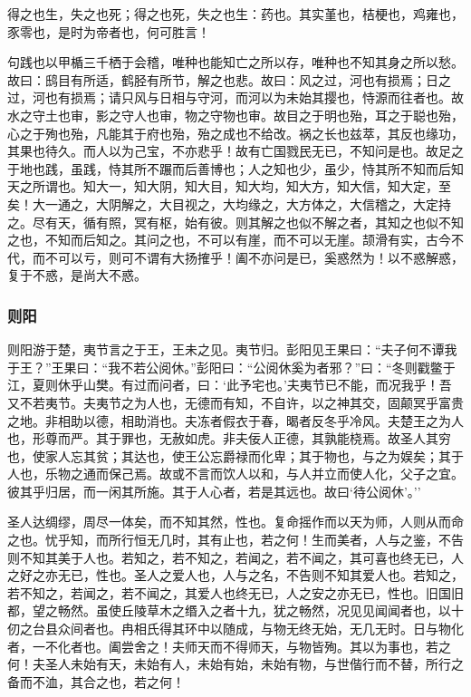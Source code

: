 \documentclass[]{article}
\begin{document}
得之也生，失之也死；得之也死，失之也生：药也。其实堇也，桔梗也，鸡雍也，豕零也，是时为帝者也，何可胜言！

句践也以甲楯三千栖于会稽，唯种也能知亡之所以存，唯种也不知其身之所以愁。故曰：鸱目有所适，鹤胫有所节，解之也悲。故曰：风之过，河也有损焉；日之过，河也有损焉；请只风与日相与守河，而河以为未始其撄也，恃源而往者也。故水之守土也审，影之守人也审，物之守物也审。故目之于明也殆，耳之于聪也殆，心之于殉也殆，凡能其于府也殆，殆之成也不给改。祸之长也兹萃，其反也缘功，其果也待久。而人以为己宝，不亦悲乎！故有亡国戮民无已，不知问是也。故足之于地也践，虽践，恃其所不蹍而后善博也；人之知也少，虽少，恃其所不知而后知天之所谓也。知大一，知大阴，知大目，知大均，知大方，知大信，知大定，至矣！大一通之，大阴解之，大目视之，大均缘之，大方体之，大信稽之，大定持之。尽有天，循有照，冥有枢，始有彼。则其解之也似不解之者，其知之也似不知之也，不知而后知之。其问之也，不可以有崖，而不可以无崖。颉滑有实，古今不代，而不可以亏，则可不谓有大扬搉乎！阖不亦问是已，奚惑然为！以不惑解惑，复于不惑，是尚大不惑。

\hypertarget{header-n414}{%
\subsubsection{则阳}\label{header-n414}}

则阳游于楚，夷节言之于王，王未之见。夷节归。彭阳见王果曰：``夫子何不谭我于王？''王果曰：``我不若公阅休。''彭阳曰：``公阅休奚为者邪？''曰：``冬则戳鳖于江，夏则休乎山樊。有过而问者，曰：`此予宅也。'夫夷节已不能，而况我乎！吾又不若夷节。夫夷节之为人也，无德而有知，不自许，以之神其交，固颠冥乎富贵之地。非相助以德，相助消也。夫冻者假衣于春，暍者反冬乎冷风。夫楚王之为人也，形尊而严。其于罪也，无赦如虎。非夫佞人正德，其孰能桡焉。故圣人其穷也，使家人忘其贫；其达也，使王公忘爵禄而化卑；其于物也，与之为娱矣；其于人也，乐物之通而保己焉。故或不言而饮人以和，与人并立而使人化，父子之宜。彼其乎归居，而一闲其所施。其于人心者，若是其远也。故曰`待公阅休'。''

圣人达绸缪，周尽一体矣，而不知其然，性也。复命摇作而以天为师，人则从而命之也。忧乎知，而所行恒无几时，其有止也，若之何！生而美者，人与之鉴，不告则不知其美于人也。若知之，若不知之，若闻之，若不闻之，其可喜也终无已，人之好之亦无已，性也。圣人之爱人也，人与之名，不告则不知其爱人也。若知之，若不知之，若闻之，若不闻之，其爱人也终无已，人之安之亦无已，性也。旧国旧都，望之畅然。虽使丘陵草木之缗入之者十九，犹之畅然，况见见闻闻者也，以十仞之台县众间者也。冉相氏得其环中以随成，与物无终无始，无几无时。日与物化者，一不化者也。阖尝舍之！夫师天而不得师天，与物皆殉。其以为事也，若之何！夫圣人未始有天，未始有人，未始有始，未始有物，与世偕行而不替，所行之备而不洫，其合之也，若之何！
\end{document}
